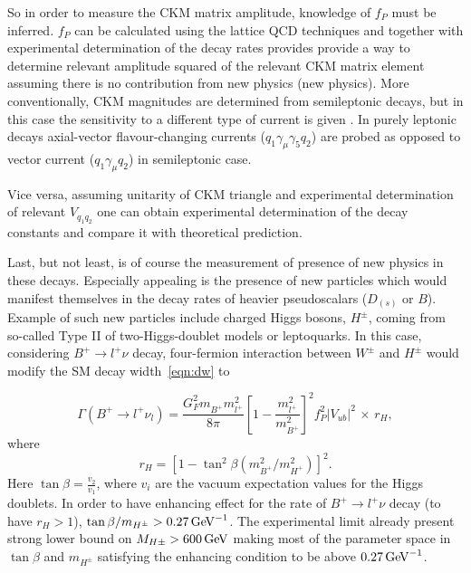 So in order to measure the \gls{CKM} matrix amplitude, knowledge of $f_{P}$ must be inferred. $f_{P}$ can be calculated using the lattice \gls{QCD} techniques and together with experimental determination of the decay rates provides provide a way to determine relevant amplitude squared of the relevant \gls{CKM} matrix element assuming there is no contribution from new physics (new physics). More conventionally, \gls{CKM} magnitudes are determined from semileptonic decays, but in this case the sensitivity to a different type of current is given . In purely leptonic decays axial-vector flavour-changing currents ($q_{1}\gamma_{\mu}\gamma_{5}q_{2}$) are probed as opposed to vector current ($q_{1}\gamma_{\mu}q_{2}$) in semileptonic case.

Vice versa, assuming unitarity of \gls{CKM} triangle and experimental determination of relevant $V_{q_{1}q_{2}}$ one can obtain experimental determination of the decay constants and compare it with theoretical prediction.

Last, but not least, is of course the measurement of presence of new physics in these decays. Especially appealing is the presence of new particles which would manifest themselves in the decay rates of heavier pseudoscalars ($D_{(s)}$ or $B$). Example of such new particles include charged Higgs bosons, $H^{\pm}$, coming from so-called Type II of two-Higgs-doublet models \cite{Hou:1992sy}\cite{Akeroyd:2003zr}\cite{Dobrescu:2008er} or leptoquarks\cite{Dobrescu:2008er}. In this case, considering $B^{+}\rightarrow l^{+}\nu$ decay, four-fermion interaction between $W^{\pm}$ and $H^{\pm}$ would modify the \gls{SM} decay width~\autoref{eqn:dw} to

\begin{equation}
\Gamma(B^{+} \rightarrow {l^{+}} \nu_{l})=  
        \frac{G_{F}^{2} m^{}_{B^{+}}  m_{l^{+}}^{2}}{8\pi} 
        \left[1 - \frac{m_{l^{+}}^{2}}{m_{B^{+}}^{2}}\right]^{2}  
	f_{P}^{2} |V_{ub}|^{2} \,\times\, r_H,
\end{equation}
where
\begin{equation}
	r_H=[1-\tan^2\beta(m^{2}_{B^{+}}/m^{2}_{H^{+}})]^2.
\end{equation}
Here $\tan\beta = \frac{v_{2}}{v_{1}}$, where $v_{i}$ are the vacuum expectation values for the Higgs doublets. In order to have enhancing effect for the rate of $B^{+}\rightarrow l^{+}\nu$ decay (to have $r_{H}>1$), $\tan\beta/m_{H^{\pm}}> 0.27 \mathrm{\,Ge\kern -0.1em V}^{-1}$. The experimental limit already present strong lower bound on $M_{H\pm}>600\mathrm{\,Ge\kern -0.1em V}$\cite{Arbey:2017gmh} making most of the parameter space in $\tan\beta$ and $m_{H^{\pm}}$ satisfying the enhancing condition to be above $0.27 \mathrm{\,Ge\kern -0.1em V}^{-1}$.

